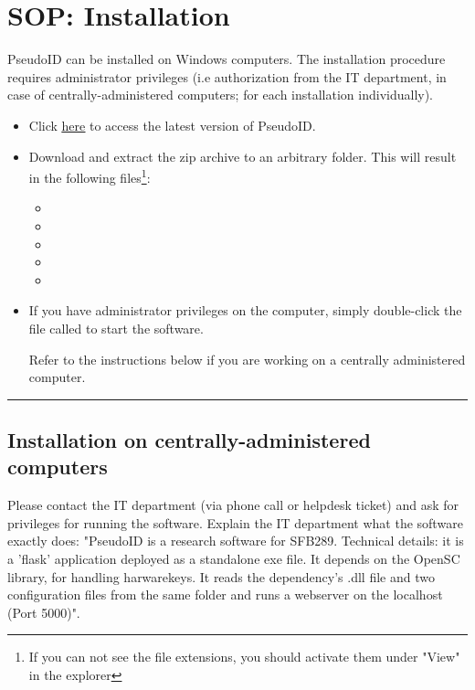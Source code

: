 \section{SOP: Installation}
\label{section:sop_installation}
PseudoID can be installed on Windows computers. The installation procedure requires administrator privileges (i.e authorization from the IT department, in case of centrally-administered computers; for each installation individually).

\begin{itemize}
    \item Click  \href{https://github.com/spisakt/PseudoID/releases}{\underline{here}} to access the latest version of PseudoID.
    \item Download and extract the zip archive to an arbitrary folder. This will result in the following files\footnote{If you can not see the file extensions, you should activate them under "View" in the explorer}: 
    \begin{itemize}
        \item {}
        \item {}
        \item {}
        \item {} 
        \item {}
    \end{itemize}
    \item If you have administrator privileges on the computer, simply double-click the file called  to start the software.
    
    Refer to the instructions below if you are working on a centrally administered computer.
\end{itemize} 
\par\noindent\rule{\textwidth\color{pniblue}}{0.4pt}

\subsection*{Installation on centrally-administered computers}

Please contact the IT department (via phone call or helpdesk ticket) and ask for privileges for running the software. Explain the IT department what the software exactly does: "PseudoID is a research software for SFB289. Technical details: it is a 'flask' application deployed as a standalone exe file. It depends on the OpenSC library, for handling harwarekeys.  It reads the dependency's .dll file and two configuration files from the same folder and runs a webserver on the localhost (Port 5000)".

